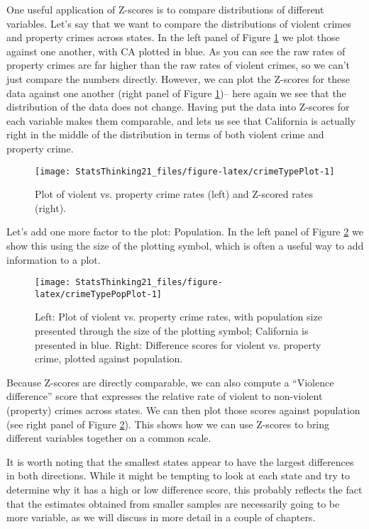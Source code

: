 \documentclass[]{book}
\theoremstyle{definition}
\theoremstyle{definition}
\theoremstyle{definition}
\theoremstyle{remark}
\begin{document}
One useful application of Z-scores is to compare distributions of
different variables. Let's say that we want to compare the distributions
of violent crimes and property crimes across states. In the left panel
of Figure \ref{fig:crimeTypePlot} we plot those against one another,
with CA plotted in blue. As you can see the raw rates of property crimes
are far higher than the raw rates of violent crimes, so we can't just
compare the numbers directly. However, we can plot the Z-scores for
these data against one another (right panel of Figure
\ref{fig:crimeTypePlot})-- here again we see that the distribution of
the data does not change. Having put the data into Z-scores for each
variable makes them comparable, and lets us see that California is
actually right in the middle of the distribution in terms of both
violent crime and property crime.

\begin{figure}
\texttt{[image: StatsThinking21\_files/figure-latex/crimeTypePlot-1]} \caption{Plot of violent vs. property crime rates (left) and Z-scored rates (right).}\label{fig:crimeTypePlot}
\end{figure}

Let's add one more factor to the plot: Population. In the left panel of
Figure \ref{fig:crimeTypePopPlot} we show this using the size of the
plotting symbol, which is often a useful way to add information to a
plot.

\begin{figure}
\texttt{[image: StatsThinking21\_files/figure-latex/crimeTypePopPlot-1]} \caption{Left: Plot of violent vs. property crime rates, with population size presented through the size of the plotting symbol; California is presented in blue. Right: Difference scores for violent vs. property crime, plotted against population. }\label{fig:crimeTypePopPlot}
\end{figure}

Because Z-scores are directly comparable, we can also compute a
``Violence difference'' score that expresses the relative rate of
violent to non-violent (property) crimes across states. We can then plot
those scores against population (see right panel of Figure
\ref{fig:crimeTypePopPlot}). This shows how we can use Z-scores to bring
different variables together on a common scale.

It is worth noting that the smallest states appear to have the largest
differences in both directions. While it might be tempting to look at
each state and try to determine why it has a high or low difference
score, this probably reflects the fact that the estimates obtained from
smaller samples are necessarily going to be more variable, as we will
discuss in more detail in a couple of chapters.
\end{document}
